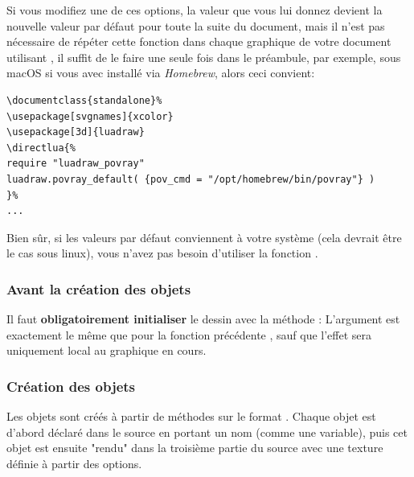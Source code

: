 Si vous modifiez une de ces options, la valeur que vous lui donnez devient la nouvelle valeur par défaut pour toute la suite du document, mais il n'est pas nécessaire de répéter cette fonction dans chaque graphique de votre document utilisant \povray, il suffit de le faire une seule fois dans le préambule, par exemple, sous macOS si vous avec installé \povray via \emph{Homebrew}, alors ceci convient:

\begin{verbatim}
\documentclass{standalone}%
\usepackage[svgnames]{xcolor}
\usepackage[3d]{luadraw}
\directlua{%
require "luadraw_povray"
luadraw.povray_default( {pov_cmd = "/opt/homebrew/bin/povray"} )
}%
...
\end{verbatim}
Bien sûr, si les valeurs par défaut conviennent à votre système (cela devrait être le cas sous linux), vous n'avez pas besoin d'utiliser la fonction .

\subsubsection{Avant la création des objets}

Il faut \textbf{obligatoirement initialiser} le dessin \povray avec la méthode : 
L'argument  est exactement le même que pour la fonction précédente , sauf que l'effet sera uniquement local au graphique en cours.


\subsubsection{Création des objets}

Les objets sont créés à partir de méthodes sur le format . Chaque objet est d'abord déclaré dans le source \povray en portant un nom (comme une variable), puis cet objet est ensuite "rendu" dans la troisième partie du source avec une texture définie à partir des options.

